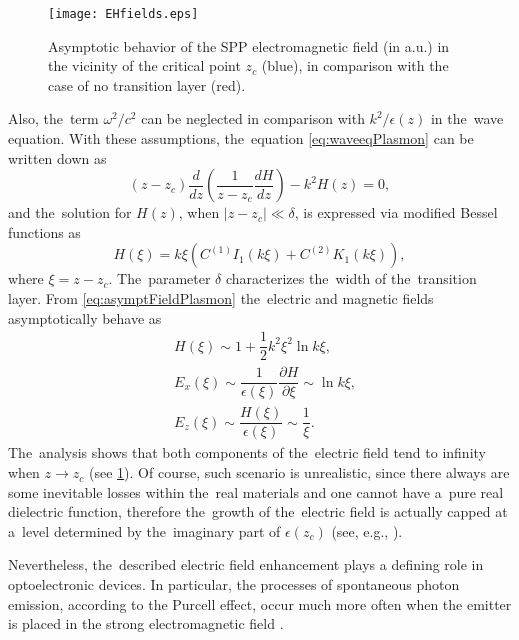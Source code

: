 \begin{figure}[ptb]
\begin{center}
\texttt{[image: EHfields.eps]}
\caption{Asymptotic behavior of the SPP electromagnetic field (in a.u.) in the vicinity of the critical point $z_c$ (blue), in comparison with the case of no transition layer (red).}
\label{fig:EHfieldsPlasmon}
\end{center}
\end{figure}


Also, the~term $\omega^2/c^2$ can be neglected in comparison with $k^2/\epsilon(z)$ in the~wave equation.
With these assumptions, the~equation \cref{eq:waveeqPlasmon} can be written down as
\begin{equation}
\left(z-z_c\right)\dfrac{d}{dz}\left(\dfrac{1}{z-z_c}\dfrac{dH}{dz}\right)-k^2 H(z) = 0,
\end{equation}
and the~solution for $H(z)$, when $|z-z_c| \ll \delta$, is expressed via modified Bessel functions as
\begin{equation}
\label{eq:asymptFieldPlasmon}
H(\xi) = k\xi \left(C^{(1)} I_1\left(k\xi\right) + C^{(2)} K_1\left(k\xi\right)\right),
\end{equation}
where $\xi = z-z_c$.
The~parameter $\delta$ characterizes the~width of the~transition layer.
From \cref{eq:asymptFieldPlasmon} the~electric and magnetic fields asymptotically behave as
\begin{align}
&H(\xi) \sim 1+\dfrac12 k^2 \xi^2 \ln k\xi,\\
&E_x(\xi) \sim \dfrac{1}{\epsilon(\xi)}\dfrac{\partial H}{\partial \xi} \sim \ln k\xi,\\
&E_z(\xi) \sim \dfrac{H(\xi)}{\epsilon(\xi)} \sim \dfrac{1}{\xi}.
\end{align}
The~analysis shows that both components of the~electric field tend to infinity when $z \rightarrow z_c$ (see \cref{fig:EHfieldsPlasmon}).
Of course, such scenario is unrealistic, since there always are some inevitable losses within the~real materials and one cannot have a~pure real dielectric function, therefore the~growth of the~electric field is actually capped at a~level determined by the~imaginary part of $\epsilon(z_c)$ (see, e.g., \cite{ginzburg}).

Nevertheless, the~described electric field enhancement plays a defining role in optoelectronic devices.
In particular, the processes of spontaneous photon emission, according to the Purcell effect, occur much more often when the emitter is placed in the strong electromagnetic field \cite{schuller}.

